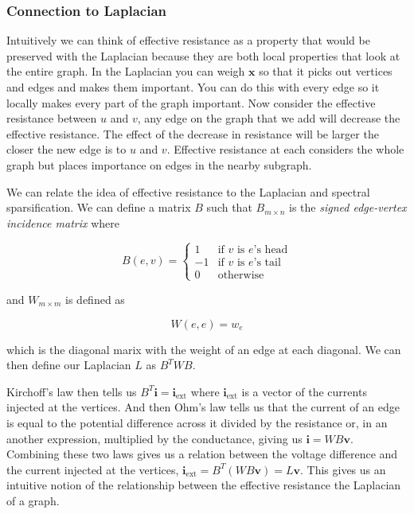 \documentclass[12pt,twoside]{article}
\begin{document}

\subsubsection{Connection to Laplacian}

Intuitively we can think of effective resistance as a property that would be preserved with the Laplacian because they are both local properties that look at the entire graph. In the Laplacian you can weigh $\mathbf{x}$ so that it picks out vertices and edges and makes them important. You can do this with every edge so it locally makes every part of the graph important. Now consider the effective resistance between $u$ and $v$, any edge on the graph that we add will decrease the effective resistance. The effect of the decrease in resistance will be larger the closer the new edge is to $u$ and $v$. Effective resistance at each considers the whole graph but places importance on edges in the nearby subgraph.

We can relate the idea of effective resistance to the Laplacian and spectral sparsification. We can define a matrix $B$ such that $B_{m \times n}$ is the \textit{signed edge-vertex incidence matrix} \cite{spielman-effective-resistance} where 

\begin{equation}
\label{def:resistance-b}
B(e,v)  = 
            \begin{cases}
                1     &\mbox{if $v$ is $e$'s head} \\
                -1    &\mbox{if $v$ is $e$'s tail} \\
                0     &\mbox{otherwise} 
            \end{cases}
\end{equation}

and $W_{m \times m}$ is defined as 

\begin{equation}
\label{def:resistance-w}
W(e,e) = w_e
\end{equation}

which is the diagonal marix with the weight of an edge at each diagonal. We can then define our Laplacian $L$ as $B^T W B$. 

Kirchoff's law then tells us $B^T \mathbf{i} = \mathbf{i}_{\text{ext}}$ where $\mathbf{i}_\text{ext}$ is a vector of the currents injected at the vertices. And then Ohm's law tells us that the current of an edge is equal to the potential difference across it divided by the resistance or, in an another expression, multiplied by the conductance, giving us $\mathbf{i} = WB \mathbf{v}$. Combining these two laws gives us a relation between the voltage difference and the current injected at the vertices, $\mathbf{i}_\text{ext} = B^T(WB\mathbf{v}) = L\textbf{v}$. This gives us an intuitive notion of the relationship between the effective resistance the Laplacian of a graph.
\end{document}
